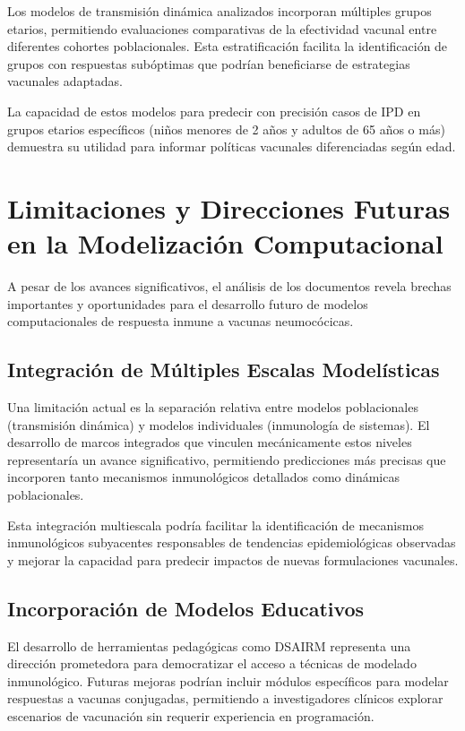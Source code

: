 Los modelos de transmisión dinámica analizados incorporan múltiples grupos etarios, permitiendo evaluaciones comparativas de la efectividad vacunal entre diferentes cohortes poblacionales. Esta estratificación facilita la identificación de grupos con respuestas subóptimas que podrían beneficiarse de estrategias vacunales adaptadas.

La capacidad de estos modelos para predecir con precisión casos de IPD en grupos etarios específicos (niños menores de 2 años y adultos de 65 años o más) demuestra su utilidad para informar políticas vacunales diferenciadas según edad.

\section{Limitaciones y Direcciones Futuras en la Modelización Computacional}

A pesar de los avances significativos, el análisis de los documentos revela brechas importantes y oportunidades para el desarrollo futuro de modelos computacionales de respuesta inmune a vacunas neumocócicas.

\subsection{Integración de Múltiples Escalas Modelísticas}

Una limitación actual es la separación relativa entre modelos poblacionales (transmisión dinámica) y modelos individuales (inmunología de sistemas). El desarrollo de marcos integrados que vinculen mecánicamente estos niveles representaría un avance significativo, permitiendo predicciones más precisas que incorporen tanto mecanismos inmunológicos detallados como dinámicas poblacionales.

Esta integración multiescala podría facilitar la identificación de mecanismos inmunológicos subyacentes responsables de tendencias epidemiológicas observadas y mejorar la capacidad para predecir impactos de nuevas formulaciones vacunales.



\subsection{Incorporación de Modelos Educativos}

El desarrollo de herramientas pedagógicas como DSAIRM \cite{Handel2020} representa una dirección prometedora para democratizar el acceso a técnicas de modelado inmunológico. Futuras mejoras podrían incluir módulos específicos para modelar respuestas a vacunas conjugadas, permitiendo a investigadores clínicos explorar escenarios de vacunación sin requerir experiencia en programación.


